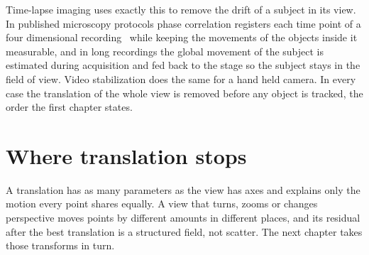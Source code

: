 Time-lapse imaging uses exactly this to remove the drift of a subject in its view. In published
microscopy protocols phase correlation registers each time point of a four dimensional recording~\cite{src:PMC4166950}
while keeping the movements of the objects inside it measurable, and in long recordings the global
movement of the subject is estimated during acquisition and fed back to the stage so the subject
stays in the field of view. Video stabilization does the same for a hand held camera. In every case
the translation of the whole view is removed before any object is tracked, the order the
first chapter states.

\section{Where translation stops}

A translation has as many parameters as the view has axes and explains only the motion every point
shares equally. A view that turns, zooms or changes perspective moves points by different amounts
in different places, and its residual after the best translation is a structured field, not
scatter. The next chapter takes those transforms in turn.
